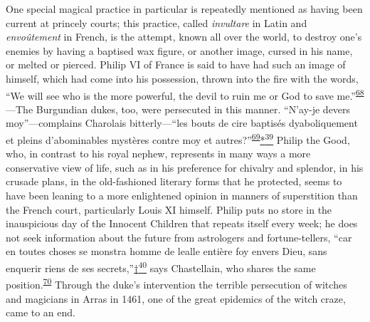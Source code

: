 One special magical practice in particular is repeatedly mentioned as
having been current at princely courts; this practice, called
\emph{invultare} in Latin and \emph{envoûtement} in French, is the
attempt, known all over the world, to destroy one's enemies by having a
baptised wax figure, or another image, cursed in his name, or melted or
pierced. Philip VI of France is said to have had such an image of
himself, which had come into his possession, thrown into the fire with
the words, ``We will see who is the more powerful, the devil to ruin me
or God to save
me.''\textsuperscript{\protect\hypertarget{18_Chapter_Eleven__THE_FORMS_OF_THO.xhtmlux5cux23id_498}{\protect\hyperlink{23_NOTES.xhtmlux5cux23id_499}{68}}}---The
Burgundian dukes, too, were persecuted in this manner. ``N'ay-je devers
moy''---complains Charolais bitterly---``les bouts de cire baptisés
dyaboliquement et pleins d'abominables mystères contre moy et
autres?''\textsuperscript{\protect\hypertarget{18_Chapter_Eleven__THE_FORMS_OF_THO.xhtmlux5cux23id_496}{\protect\hyperlink{23_NOTES.xhtmlux5cux23id_497}{69}}}\protect\hypertarget{18_Chapter_Eleven__THE_FORMS_OF_THO.xhtmlux5cux23id_2639}{\protect\hyperlink{23_NOTES.xhtmlux5cux23id_2640}{*\textsuperscript{39}}}
Philip the Good, who, in contrast to his royal nephew, represents in
many ways a more conservative view of life, such as in his preference
for chivalry and splendor, in his crusade plans, in the old-fashioned
literary forms that he protected, seems to have been leaning to a more
enlightened opinion in manners of superstition than the French court,
particularly Louis XI himself. Philip puts no store in the inauspicious
day of the Innocent Children that repeats itself every week; he does not
seek information about the future from astrologers and fortune-tellers,
``car en toutes choses se monstra homme de lealle entière foy envers
Dieu, sans enquerir riens de ses
secrets,''\protect\hypertarget{18_Chapter_Eleven__THE_FORMS_OF_THO.xhtmlux5cux23id_2641}{\protect\hyperlink{23_NOTES.xhtmlux5cux23id_2642}{†\textsuperscript{40}}}
says Chastellain, who shares the same
position.\textsuperscript{\protect\hypertarget{18_Chapter_Eleven__THE_FORMS_OF_THO.xhtmlux5cux23id_494}{\protect\hyperlink{23_NOTES.xhtmlux5cux23id_495}{70}}}
Through the duke's intervention the terrible persecution of witches and
magicians in Arras in 1461, one of the great epidemics of the witch
craze, came to an end.

